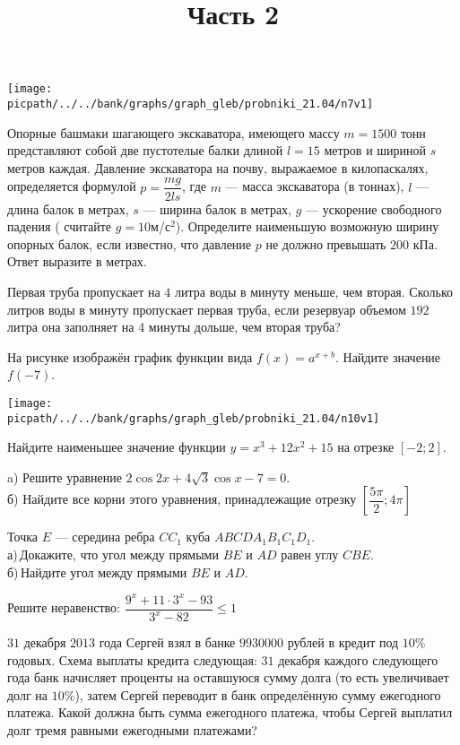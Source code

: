 \begin{training}[1]
\begin{listofex}[resume]
		\begin{center}
			\texttt{[image: \\picpath/../../bank/graphs/graph\_gleb/probniki\_21.04/n7v1]}
		\end{center}
		\foranswer
		\item Опорные башмаки шагающего экскаватора, имеющего массу \( m=1500 \) тонн представляют собой две пустотелые балки длиной \( l=15 \) метров и шириной \( s \) метров каждая. Давление экскаватора на почву, выражаемое в килопаскалях, определяется формулой \( p=\dfrac{mg}{2ls} \), где \( m \) --- масса экскаватора (в тоннах), \( l \) ---длина балок в метрах, \( s \) --- ширина балок в метрах, \( g \) --- ускорение свободного падения ( считайте \( g=10 \)м/с\( ^2 \)). Определите наименьшую возможную ширину опорных балок, если известно, что давление \( p \) не должно превышать \( 200 \) кПа. Ответ выразите в метрах.
		\foranswer
		\item Первая труба пропускает на \( 4 \) литра воды в минуту меньше, чем вторая. Сколько литров воды в минуту пропускает первая труба, если резервуар объемом \( 192 \) литра она заполняет на 4 минуты дольше, чем вторая труба?
		\foranswer
		\hphantom{Часть 1}
		\item 
		На рисунке изображён график функции вида \( f(x)=a^{x+b} \). Найдите значение \( f(-7) \).
		\begin{center}
			\texttt{[image: \\picpath/../../bank/graphs/graph\_gleb/probniki\_21.04/n10v1]}
		\end{center}
		\foranswer
		\item Найдите наименьшее значение функции \( y=x^3+12x^2+15 \) на отрезке \( [-2;2] \).
		\foranswer
		\egepreambtwo
		\title{Часть 2}
		\item a) Решите уравнение \( 2\cos2x+4\sqrt{3}\cos x-7=0	 \). \\
		б) Найдите все корни этого уравнения, принадлежащие отрезку \( \left[ \dfrac{5\pi}{2}; 4\pi \right]  \)
		\hphantom{Часть 1}
		\item Точка \( E \) --- середина ребра \( CC_1 \) куба \( ABCDA_1B_1C_1D_1 \). \\
		а) Докажите, что угол между прямыми \( BE \) и \( AD \) равен углу \( CBE \).\\		
		б) Найдите угол между прямыми \( BE \) и \( AD \).
		\item Решите неравенство: \( \dfrac{9^x+11\cdot3^x-93}{3^x-82}\le1 \)
		\item \( 31 \) декабря \( 2013 \) года Сергей взял в банке \( 9 930 000 \) рублей в кредит под \( 10\% \) годовых. Схема выплаты кредита следующая: \( 31 \) декабря каждого следующего года банк начисляет проценты на оставшуюся сумму долга (то есть увеличивает долг на \( 10\% \)), затем Сергей переводит в банк определённую сумму ежегодного платежа. Какой должна быть сумма ежегодного платежа, чтобы Сергей выплатил долг тремя равными ежегодными платежами?

\end{listofex}
\end{training}

